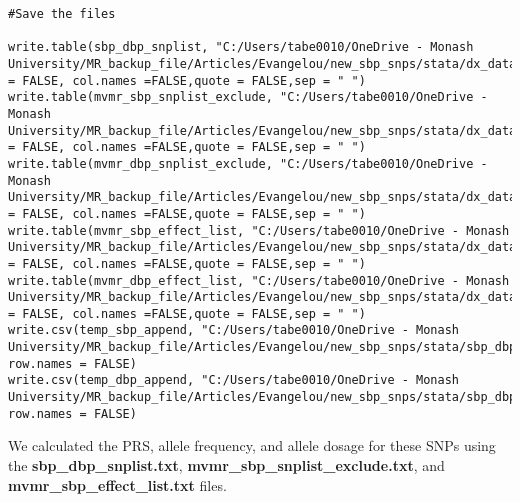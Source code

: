 \documentclass[11pt]{article}
\newcounter{subsubsubsection}[subsubsection]
\begin{document}
\begin{lstlisting}[style=Rstyle]
#Save the files 

write.table(sbp_dbp_snplist, "C:/Users/tabe0010/OneDrive - Monash University/MR_backup_file/Articles/Evangelou/new_sbp_snps/stata/dx_data/sbp_dbp/data/sbp_dbp_snplist.txt",row.names = FALSE, col.names =FALSE,quote = FALSE,sep = " ")
write.table(mvmr_sbp_snplist_exclude, "C:/Users/tabe0010/OneDrive - Monash University/MR_backup_file/Articles/Evangelou/new_sbp_snps/stata/dx_data/sbp_dbp/data/mvmr_sbp_snplist_exclude.txt",row.names = FALSE, col.names =FALSE,quote = FALSE,sep = " ")
write.table(mvmr_dbp_snplist_exclude, "C:/Users/tabe0010/OneDrive - Monash University/MR_backup_file/Articles/Evangelou/new_sbp_snps/stata/dx_data/sbp_dbp/data/mvmr_dbp_snplist_exclude.txt",row.names = FALSE, col.names =FALSE,quote = FALSE,sep = " ")
write.table(mvmr_sbp_effect_list, "C:/Users/tabe0010/OneDrive - Monash University/MR_backup_file/Articles/Evangelou/new_sbp_snps/stata/dx_data/sbp_dbp/data/mvmr_sbp_effect_list.txt",row.names = FALSE, col.names =FALSE,quote = FALSE,sep = " ")
write.table(mvmr_dbp_effect_list, "C:/Users/tabe0010/OneDrive - Monash University/MR_backup_file/Articles/Evangelou/new_sbp_snps/stata/dx_data/sbp_dbp/data/mvmr_dbp_effect_list.txt",row.names = FALSE, col.names =FALSE,quote = FALSE,sep = " ")
write.csv(temp_sbp_append, "C:/Users/tabe0010/OneDrive - Monash University/MR_backup_file/Articles/Evangelou/new_sbp_snps/stata/sbp_dbp_snps/mvmr_sbp.csv", row.names = FALSE)
write.csv(temp_dbp_append, "C:/Users/tabe0010/OneDrive - Monash University/MR_backup_file/Articles/Evangelou/new_sbp_snps/stata/sbp_dbp_snps/mvmr_dbp.csv", row.names = FALSE)

\end{lstlisting}
\color{black}


We calculated the PRS, allele frequency, and allele dosage for these SNPs using the \textbf{sbp\_dbp\_snplist.txt}, \textbf{mvmr\_sbp\_snplist\_exclude.txt}, and \textbf{mvmr\_sbp\_effect\_list.txt} files.
\end{document}
